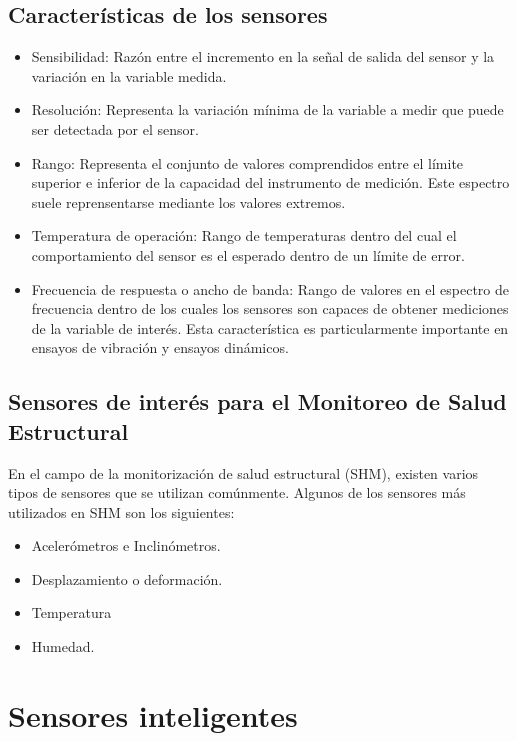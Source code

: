 \subsection{Características de los sensores}

\begin{itemize}
    \item Sensibilidad: Razón entre el incremento en la señal de salida del sensor y la variación en la variable medida.
    \item Resolución: Representa la variación mínima de la variable a medir que puede ser detectada por el sensor.
    \item Rango: Representa el conjunto de valores comprendidos entre el límite superior e inferior de la capacidad del instrumento de medición. Este espectro suele reprensentarse mediante los valores extremos.
    \item Temperatura de operación: Rango de temperaturas dentro del cual el comportamiento del sensor es el esperado dentro de un límite de error.
    \item Frecuencia de respuesta o ancho de banda: Rango de valores en el espectro de frecuencia dentro de los cuales los sensores son capaces de obtener mediciones de la variable de interés. Esta característica es particularmente importante en ensayos de vibración y ensayos dinámicos.
\end{itemize}

\subsection{Sensores de interés para el Monitoreo de Salud Estructural}

En el campo de la monitorización de salud estructural (SHM), existen varios tipos de sensores que se utilizan comúnmente. Algunos de los sensores más utilizados en SHM son los siguientes:

    \begin{itemize}
        \item Acelerómetros e Inclinómetros.
        \item Desplazamiento o deformación.
        \item Temperatura 
        \item Humedad.
    \end{itemize}

\section{Sensores inteligentes}

